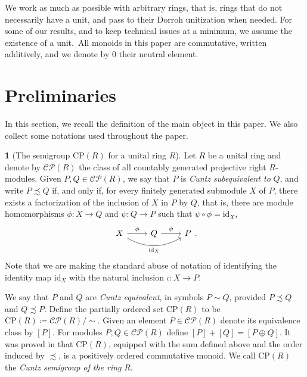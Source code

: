 \documentclass[11pt]{amsart}
\numberwithin{equation}{section}
\theoremstyle{definition}
\newtheorem{pgr}[pgrCt]{}
\newcommand{\CP}{\mathrm{CP}}
\theoremstyle{plain}
\theoremstyle{definition}
\begin{document}
We work as much as possible with arbitrary rings, that is, rings that do not necessarily have a unit, and pass to their Dorroh unitization when needed. For some of our results, and to keep technical issues at a minimum, we assume the existence of a unit.~All monoids in this paper are commutative, written additively, and we denote by $0$ their neutral element.

\section{Preliminaries}

In this section, we recall the definition of the main object in this paper. We also collect some notations used throughout the paper.

\begin{pgr}[The semigroup $\CP(R)$ for a unital ring $R$]\label{definicio cp(r) unital} Let $R$ be a unital ring and denote by $\mathcal{CP}(R)$ the class of all countably generated projective right $R$-modules. Given $P, Q \in \mathcal{CP}(R)$, we say that $P$ is \emph{Cuntz subequivalent to} $Q$, and write $P \precsim Q$ if, and only if, for every finitely generated submodule $X$ of $P$, there exists a factorization of the inclusion of $X$ in $P$ by $Q$, that is, there are module homomorphisms $\phi\colon X \rightarrow Q$ and $\psi \colon Q \rightarrow P$ such that $\psi \circ \phi = \mathrm{id}_X$,
\[
\begin{tikzcd}
X \arrow[r,"\phi"] \arrow[swap, rr, bend right, "\mathrm{id}_X"] & Q \arrow[r, "\psi"] & P 
\end{tikzcd}.
\]
Note that we are making the standard abuse of notation of identifying the identity map $\mathrm{id}_X$ with the natural inclusion $\iota \colon X \rightarrow P$.

We say that $P$ and $Q$ are \emph{Cuntz equivalent}, in symbols $P\sim Q$, provided $P \precsim Q$ and $Q \precsim P$. Define the partially ordered set $\mathrm{CP}(R)$ to be $\mathrm{CP}(R) \coloneqq \mathcal{CP}(R)/{\sim}$. Given an element $P \in \mathcal{CP}(R)$ denote its equivalence class by $[P]$. For modules $P, Q \in \mathcal{CP}(R)$ define $[P] + [Q] = [P \oplus Q]$. It was proved in \cite[Lemma 4.5]{AntAraBosPerVil25} that $\mathrm{CP}(R)$, equipped with the sum defined above and the order induced by $\precsim$, is a positively ordered commutative monoid. We call $\mathrm{CP}(R)$ the \emph{Cuntz semigroup of the ring} $R$. 
\end{pgr}
\end{document}
